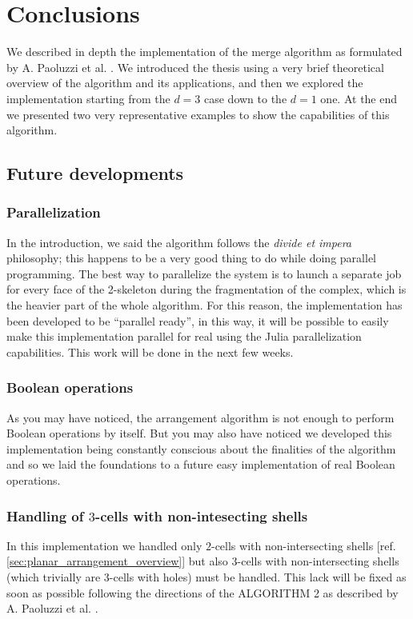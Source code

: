 \chapter{Conclusions}

We described in depth the implementation of
the merge algorithm as formulated by A. Paoluzzi et al.
\cite{Paoluzzi}. We introduced the thesis using a very brief
theoretical overview of the algorithm and its applications,
and then we explored the implementation starting from
the $d=3$ case down to the $d=1$ one. At the end we presented
two very representative examples to show the capabilities of this
algorithm.

\section{Future developments}

\subsection{Parallelization}
In the introduction, we said the algorithm follows 
the \textit{divide et impera} philosophy; this happens
to be a very good thing to do while doing parallel programming.
The best way to parallelize the system is to launch
a separate job for every face of the 2-skeleton during the
fragmentation of the complex, which is the heavier part of
the whole algorithm.
For this reason, the implementation has been developed to
be ``parallel ready'', in this way, it will be possible
to easily make this implementation parallel for real using
the Julia parallelization capabilities. This work will
be done in the next few weeks.

\subsection{Boolean operations}
As you may have noticed, the arrangement algorithm
is not enough to perform Boolean operations by itself.
But you may also have noticed we developed this implementation
being constantly conscious about the finalities of the algorithm
and so we laid the foundations to a future easy implementation
of real Boolean operations.

\subsection{Handling of $3$-cells with non-intesecting shells}
In this implementation we handled only $2$-cells with non-intersecting
shells [ref. \ref{sec:planar_arrangement_overview}] but also $3$-cells
with non-intersecting shells (which trivially are 3-cells with holes) 
must be handled. This lack will be
fixed as soon as possible following the directions of the ALGORITHM 2
as described by A. Paoluzzi et al. \cite{Paoluzzi}.

